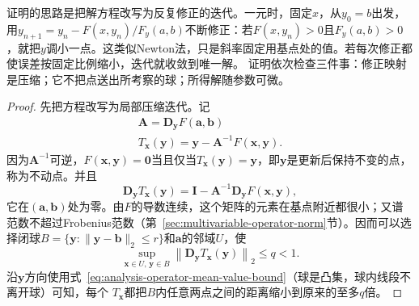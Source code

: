 证明的思路是把解方程改写为反复修正的迭代。一元时，固定$x$，从$y_0=b$出发，用$y_{n+1}=y_n-F(x,y_n)/F_y(a,b)$不断修正：若$F(x,y_n)>0$且$F_y(a,b)>0$，就把$y$调小一点。这类似Newton法，只是斜率固定用基点处的值。若每次修正都使误差按固定比例缩小，迭代就收敛到唯一解。
证明依次检查三件事：修正映射是压缩；它不把点送出所考察的球；所得解随参数可微。
\begin{proof}
先把方程改写为局部压缩迭代。记
\[
 \begin{gathered}
\bm{A}=\bm{D}_{\bm{y}}F(\bm{a},\bm{b})\\
T_{\bm{x}}(\bm{y})=\bm{y}-\bm{A}^{-1}F(\bm{x},\bm{y}).
 \end{gathered}
\]
因为$\bm A^{-1}$可逆，$F(\bm{x},\bm{y})=\bm{0}$当且仅当$T_{\bm{x}}(\bm{y})=\bm{y}$，即$\bm y$是更新后保持不变的点，称为不动点。并且
\[
 \bm{D}_{\bm{y}}T_{\bm{x}}(\bm{y})=\bm{I}-\bm{A}^{-1}\bm{D}_{\bm{y}}F(\bm{x},\bm{y}),
\]
它在$(\bm{a},\bm{b})$处为零。由$F$的导数连续，这个矩阵的元素在基点附近都很小；又谱范数不超过Frobenius范数（第~\ref{sec:multivariable-operator-norm}节）。因而可以选择闭球$B=\{\bm{y}:\lVert\bm{y}-\bm{b}\rVert_2\leq r\}$和$\bm{a}$的邻域$U$，使
\begin{equation}
  \sup_{\bm{x}\in U,\,\bm{y}\in B}
  \left\lVert
    \bm{D}_{\bm{y}}T_{\bm{x}}(\bm{y})
  \right\rVert_2
  \leq q<1.
\label{eq:analysis-ift-uniform-contraction}
\end{equation}
沿$\bm{y}$方向使用式~\eqref{eq:analysis-operator-mean-value-bound}（球是凸集，球内线段不离开球）可知，每个
$T_{\bm{x}}$都把$B$内任意两点之间的距离缩小到原来的至多$q$倍。


\end{proof}
